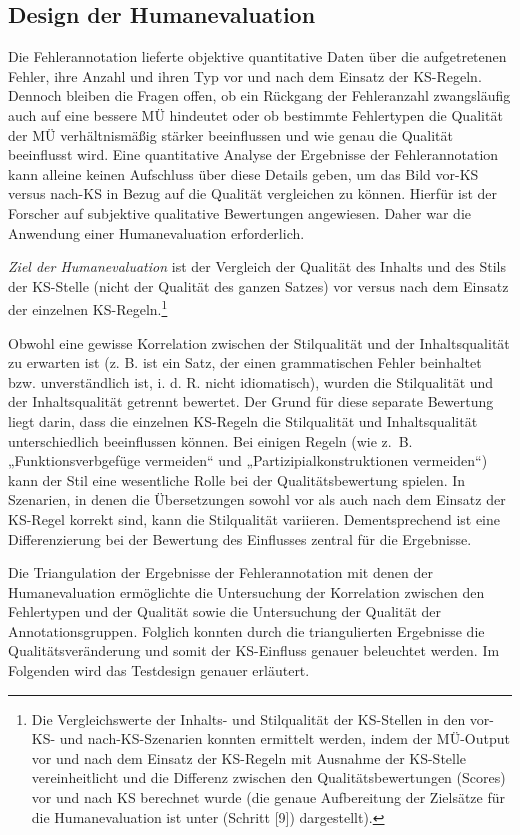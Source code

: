 \subsection{Design der Humanevaluation}
\label{sec:4.4.5}
Die Fehlerannotation lieferte objektive quantitative Daten über die aufgetretenen Fehler, ihre Anzahl und ihren Typ vor und nach dem Einsatz der KS-Regeln. Dennoch bleiben die Fragen offen, ob ein Rückgang der Fehleranzahl zwangsläufig auch auf eine bessere MÜ hindeutet oder ob bestimmte Fehlertypen die Qualität der MÜ verhältnismäßig stärker beeinflussen und wie genau die Qualität beeinflusst wird. Eine quantitative Analyse der Ergebnisse der Fehlerannotation kann alleine keinen Aufschluss über diese Details geben, um das Bild vor-KS versus nach-KS in Bezug auf die Qualität vergleichen zu können. Hierfür ist der Forscher auf subjektive qualitative Bewertungen angewiesen. Daher war die Anwendung einer Humanevaluation erforderlich.

\textit{Ziel der Humanevaluation} ist der Vergleich der Qualität des Inhalts und des Stils der KS-Stelle (nicht der Qualität des ganzen Satzes) vor versus nach dem Einsatz der einzelnen KS-Regeln.\footnote{{{{Die Vergleichswerte der Inhalts- und Stilqualität der KS-Stellen in den vor-KS- und nach-KS-Szenarien konnten ermittelt werden, indem der MÜ-Output vor und nach dem Einsatz der KS-Regeln mit Ausnahme der KS-Stelle vereinheitlicht und die Differenz zwischen den Qualitätsbewertungen (Scores) vor und nach KS berechnet wurde (die genaue Aufbereitung der Zielsätze für die Humanevaluation ist unter  (Schritt [9]) dargestellt).}}}}

Obwohl eine gewisse Korrelation zwischen der Stilqualität und der Inhaltsqualität zu erwarten ist (z. B. ist ein Satz, der einen grammatischen Fehler beinhaltet bzw. unverständlich ist, i. d. R. nicht idiomatisch), wurden die Stilqualität und der Inhaltsqualität getrennt bewertet. Der Grund für diese separate Bewertung liegt darin, dass die einzelnen KS-Regeln die Stilqualität und Inhaltsqualität unterschiedlich beeinflussen können. Bei einigen Regeln (wie z.~B. „Funktionsverbgefüge vermeiden“ und „Partizipialkonstruktionen vermeiden“) kann der Stil eine wesentliche Rolle bei der Qualitätsbewertung spielen. In Szenarien, in denen die Übersetzungen sowohl vor als auch nach dem Einsatz der KS-Regel korrekt sind, kann die Stilqualität variieren. Dementsprechend ist eine Differenzierung bei der Bewertung des Einflusses zentral für die Ergebnisse.

Die Triangulation der Ergebnisse der Fehlerannotation mit denen der Humanevaluation ermöglichte die Untersuchung der Korrelation zwischen den Fehlertypen und der Qualität sowie die Untersuchung der Qualität der Annotationsgruppen. Folglich konnten durch die triangulierten Ergebnisse die Qualitätsveränderung und somit der KS-Einfluss genauer beleuchtet werden. Im Folgenden wird das Testdesign genauer erläutert.

